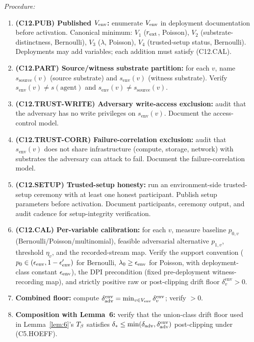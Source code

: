 \emph{Procedure:}
\begin{enumerate}
\item \textbf{(C12.PUB) Published $V_{\mathrm{env}}$:} enumerate $V_{\mathrm{env}}$ in
  deployment documentation before activation.  Canonical minimum:
  $V_1$ ($r_{\mathrm{ext}}$, Poisson), $V_2$ (substrate-distinctness, Bernoulli),
  $V_3$ ($\lambda$, Poisson), $V_4$ (trusted-setup status,
  Bernoulli).  Deployments may add variables; each addition must
  satisfy (C12.CAL).
\item \textbf{(C12.PART) Source/witness substrate partition:} for
  each $v$, name $s_{\mathrm{source}}(v)$ (source substrate) and
  $s_{\mathrm{env}}(v)$ (witness substrate).  Verify
  $s_{\mathrm{env}}(v) \neq s(\mathrm{agent})$ and
  $s_{\mathrm{env}}(v) \neq s_{\mathrm{source}}(v)$.
\item \textbf{(C12.TRUST-WRITE) Adversary write-access exclusion:}
  audit that the adversary has no write privileges on
  $s_{\mathrm{env}}(v)$.  Document the access-control model.
\item \textbf{(C12.TRUST-CORR) Failure-correlation exclusion:}
  audit that $s_{\mathrm{env}}(v)$ does not share infrastructure
  (compute, storage, network) with substrates the adversary can
  attack to fail.  Document the failure-correlation model.
\item \textbf{(C12.SETUP) Trusted-setup honesty:} run an
  environment-side trusted-setup ceremony with at least one honest
  participant.  Publish setup parameters before activation.
  Document participants, ceremony output, and audit cadence for
  setup-integrity verification.
\item \textbf{(C12.CAL) Per-variable calibration:} for each $v$,
  measure baseline $p_{0, v}$ (Bernoulli/Poisson/multinomial),
  feasible adversarial alternative $p_{1, v}$, threshold $\eta_v$,
  and the recorded-stream map.  Verify the support convention
  ($p_0 \in (\epsilon_{\mathrm{env}}, 1 - \epsilon_{\mathrm{env}}')$ for Bernoulli, $\lambda_0 \geq
  \epsilon_{\mathrm{env}}$ for Poisson, with deployment-class constant $\epsilon_{\mathrm{env}}$),
  the DPI precondition (fixed pre-deployment witness-recording
  map), and strictly positive raw or post-clipping drift floor
  $\delta_v^{\mathrm{env}} > 0$.
\item \textbf{Combined floor:} compute $\delta_{\mathrm{adv}}^{\mathrm{env}} =
  \min_{v \in V_{\mathrm{env}}} \delta_v^{\mathrm{env}}$; verify $> 0$.
\item \textbf{Composition with Lemma~6:} verify that the
  union-class drift floor used in Lemma~\ref{lem:6}'s $T_{\beta}$
  satisfies $\delta_{*} \leq \min(\delta_{\mathrm{adv}},
  \delta_{\mathrm{adv}}^{\mathrm{env}})$ post-clipping under (C5.HOEFF).
\end{enumerate}

